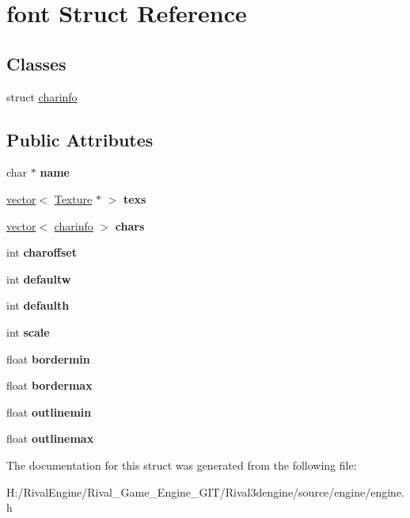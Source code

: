 \hypertarget{structfont}{}\section{font Struct Reference}
\label{structfont}
\subsection*{Classes}
\begin{DoxyCompactItemize}
\item 
struct \hyperlink{structfont_1_1charinfo}{charinfo}
\end{DoxyCompactItemize}
\subsection*{Public Attributes}
\begin{DoxyCompactItemize}
\item 
\mbox{\label{structfont_a4f4ca5bd44caf8697240668945a78ded}} 
char $\ast$ {\bfseries name}
\item 
\mbox{\label{structfont_a478d56e65e8c23e3d5d91cc7abbc6702}} 
\hyperlink{structvector}{vector}$<$ \hyperlink{struct_texture}{Texture} $\ast$ $>$ {\bfseries texs}
\item 
\mbox{\label{structfont_a31521ec273db00b71b69ea06fbce4d2b}} 
\hyperlink{structvector}{vector}$<$ \hyperlink{structfont_1_1charinfo}{charinfo} $>$ {\bfseries chars}
\item 
\mbox{\label{structfont_a89d8a2a1bc40395d3405b4acf4dff53c}} 
int {\bfseries charoffset}
\item 
\mbox{\label{structfont_ab29587e54e84bd0e74a87829432efe10}} 
int {\bfseries defaultw}
\item 
\mbox{\label{structfont_ae9374c8aaacc1a18d77cc79293238ae3}} 
int {\bfseries defaulth}
\item 
\mbox{\label{structfont_a100f003b0a274f161d59d4040d238d09}} 
int {\bfseries scale}
\item 
\mbox{\label{structfont_adc29dda614b782a1a1855070eaf62446}} 
float {\bfseries bordermin}
\item 
\mbox{\label{structfont_a786747e3d9be1bb770b21c98659b858d}} 
float {\bfseries bordermax}
\item 
\mbox{\label{structfont_a90976c1d63176f8a306d03bbe9e98d1e}} 
float {\bfseries outlinemin}
\item 
\mbox{\label{structfont_a1a5f6a3f1360b65603ef0d69614dde47}} 
float {\bfseries outlinemax}
\end{DoxyCompactItemize}


The documentation for this struct was generated from the following file\+:\begin{DoxyCompactItemize}
\item 
H\+:/\+Rival\+Engine/\+Rival\+\_\+\+Game\+\_\+\+Engine\+\_\+\+G\+I\+T/\+Rival3dengine/source/engine/engine.\+h\end{DoxyCompactItemize}
